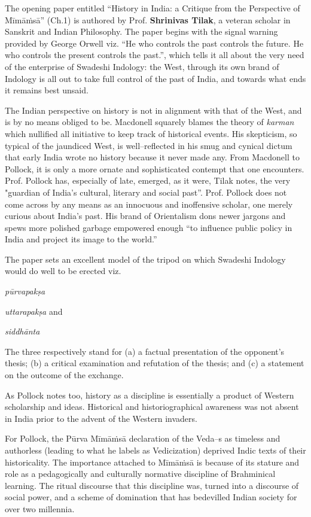 The opening paper entitled “History in India: a Critique from the Perspective of Mīmāṁsā” (Ch.1) is authored by Prof. \textbf{Shrinivas Tilak}, a veteran scholar in Sanskrit and Indian Philosophy. The paper begins with the signal warning provided by George Orwell viz. “He who controls the past controls the future. He who controls the present controls the past.”, which tells it all about the very need of the enterprise of Swadeshi Indology: the West, through its own brand of Indology is all out to take full control of the past of India, and towards what ends it remains best unsaid. 

The Indian perspective on history is not in alignment with that of the West, and is by no means obliged to be. Macdonell squarely blames the theory of \textit{karman} which nullified all initiative to keep track of historical events. His skepticism, so typical of the jaundiced West, is well–reflected in his smug and cynical dictum that early India wrote no history because it never made any. From Macdonell to Pollock, it is only a more ornate and sophisticated contempt that one encounters. Prof. Pollock has, especially of late, emerged, as it were, Tilak notes, the very "guardian of India’s cultural, literary and social past”. Prof. Pollock does not come across by any means as an innocuous and inoffensive scholar, one merely curious about India’s past. His brand of Orientalism dons newer jargons and spews more polished garbage empowered enough “to influence public policy in India and project its image to the world.”

The paper sets an excellent model of the tripod on which Swadeshi Indology would do well to be erected viz.

\item \textit{pūrvapakṣa}

 \item \textit{uttarapakṣa} and 

 \item \textit{siddhānta}

The three respectively stand for (a) a factual presentation of the opponent’s thesis; (b) a critical examination and refutation of the thesis; and (c) a statement on the outcome of the exchange. 

As Pollock notes too, history as a discipline is essentially a product of Western scholarship and ideas. Historical and historiographical awareness was not absent in India prior to the advent of the Western invaders. 

For Pollock, the Pūrva Mīmāṁsā declaration of the Veda–s as timeless and authorless (leading to what he labels as Vedicization) deprived Indic texts of their historicality. The importance attached to Mīmāṁsā is because of its stature and role as a pedagogically and culturally normative discipline of Brahminical learning. The ritual discourse that this discipline was, turned into a discourse of social power, and a scheme of domination that has bedevilled Indian society for over two millennia. 

